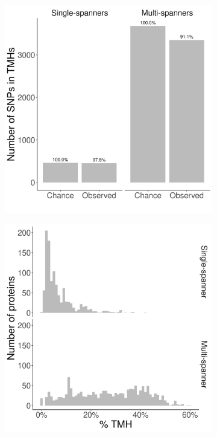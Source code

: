 \begin{figure}
  \centering
  \begin{subfigure}[t]{0.45\textwidth}
    \centering
    \caption{}
    \includegraphics[width=\linewidth]{ncbi_peregrine_results/fig_conservation_per_spanner.png}
    \label{fig:conservation_per_spanner}
  \end{subfigure}
  \hfill
  \begin{subfigure}[t]{0.45\textwidth}
    \centering
    \caption{}
    \includegraphics[width=\linewidth]{ncbi_peregrine_results/fig_f_tmh_ncbi_per_spanner.png}
    \label{fig:f_tmh_ncbi_per_spanner}
  \end{subfigure}  


\end{figure}
